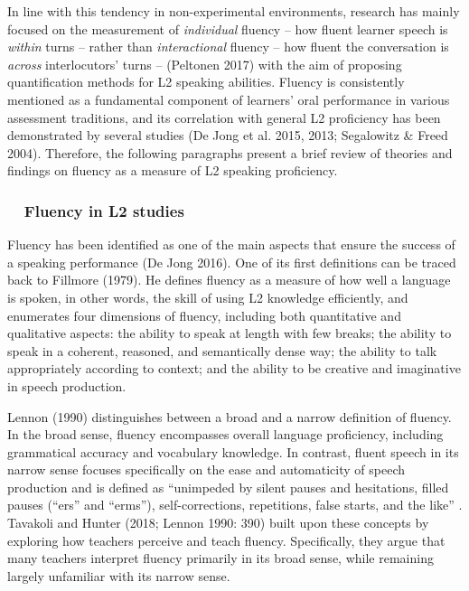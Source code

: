 \begin{styleStandard}
In line with this tendency in non-experimental environments, research has mainly focused on the measurement of \textit{individual} fluency – how fluent learner speech is \textit{within} turns – rather than \textit{interactional} fluency – how fluent the conversation is \textit{across} interlocutors’ turns – (Peltonen 2017) with the aim of proposing quantification methods for L2 speaking abilities. Fluency is consistently mentioned as a fundamental component of learners’ oral performance in various assessment traditions, and its correlation with general L2 proficiency has been demonstrated by several studies (De Jong et al. 2015, 2013; Segalowitz \& Freed 2004). Therefore, the following paragraphs present a brief review of theories and findings on fluency as a measure of L2 speaking proficiency.
\end{styleStandard}

\subsubsection[\ \ Fluency in L2 studies]{\ \ Fluency in L2 studies}
\hypertarget{Toc191305926}{}\begin{styleStandard}
Fluency has been identified as one of the main aspects that ensure the success of a speaking performance (De Jong 2016). One of its first definitions can be traced back to Fillmore (1979). He defines fluency as a measure of how well a language is spoken, in other words, the skill of using L2 knowledge efficiently, and enumerates four dimensions of fluency, including both quantitative and qualitative aspects: the ability to speak at length with few breaks; the ability to speak in a coherent, reasoned, and semantically dense way; the ability to talk appropriately according to context; and the ability to be creative and imaginative in speech production.
\end{styleStandard}

\begin{styleStandard}
Lennon (1990) distinguishes between a broad and a narrow definition of fluency. In the broad sense, fluency encompasses overall language proficiency, including grammatical accuracy and vocabulary knowledge. In contrast, fluent speech in its narrow sense focuses specifically on the ease and automaticity of speech production and is defined as “unimpeded by silent pauses and hesitations, filled pauses (“ers” and “erms”), self-corrections, repetitions, false starts, and the like” . Tavakoli and Hunter (2018; Lennon 1990: 390) built upon these concepts by exploring how teachers perceive and teach fluency. Specifically, they argue that many teachers interpret fluency primarily in its broad sense, while remaining largely unfamiliar with its narrow sense.
\end{styleStandard}

